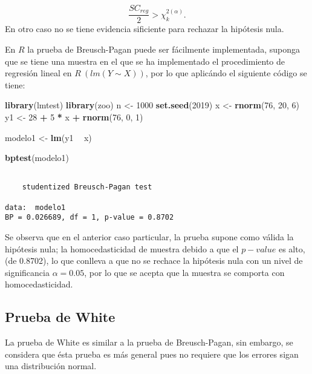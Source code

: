 \documentclass[a4paper,oneside,openany]{book}
\newenvironment{Shaded}{\begin{snugshade}}{\end{snugshade}}
\newcommand{\KeywordTok}[1]{\textcolor[rgb]{0.13,0.29,0.53}{\textbf{#1}}}
\newcommand{\DecValTok}[1]{\textcolor[rgb]{0.00,0.00,0.81}{#1}}
\newcommand{\StringTok}[1]{\textcolor[rgb]{0.31,0.60,0.02}{#1}}
\newcommand{\OperatorTok}[1]{\textcolor[rgb]{0.81,0.36,0.00}{\textbf{#1}}}
\newcommand{\NormalTok}[1]{#1}
\begin{document}
\[\frac{SC_{reg}}{2}> \chi^{2(\alpha)}_{k}.\] En otro caso no se tiene
evidencia sificiente para rechazar la hipótesis nula.

En \(R\) la prueba de Breusch-Pagan puede ser fácilmente implementada,
suponga que se tiene una muestra en el que se ha implementado el
procedimiento de regresión lineal en \(R \ (lm(Y \sim X))\), por lo que
aplicándo el siguiente código se tiene:

\begin{Shaded}
\begin{Highlighting}[]
\KeywordTok{library}\NormalTok{(lmtest)}
\KeywordTok{library}\NormalTok{(zoo)}
\NormalTok{n <-}\StringTok{ }\DecValTok{1000} 
\KeywordTok{set.seed}\NormalTok{(}\DecValTok{2019}\NormalTok{)}
\NormalTok{x <-}\StringTok{ }\KeywordTok{rnorm}\NormalTok{(}\DecValTok{76}\NormalTok{, }\DecValTok{20}\NormalTok{, }\DecValTok{6}\NormalTok{) }
\NormalTok{y1 <-}\StringTok{ }\DecValTok{28} \OperatorTok{+}\StringTok{ }\DecValTok{5} \OperatorTok{*}\StringTok{ }\NormalTok{x }\OperatorTok{+}\StringTok{ }\KeywordTok{rnorm}\NormalTok{(}\DecValTok{76}\NormalTok{, }\DecValTok{0}\NormalTok{, }\DecValTok{1}\NormalTok{)  }

\NormalTok{modelo1 <-}\StringTok{ }\KeywordTok{lm}\NormalTok{(y1 }\OperatorTok{~}\StringTok{ }\NormalTok{x)}

\KeywordTok{bptest}\NormalTok{(modelo1)}
\end{Highlighting}
\end{Shaded}

\begin{verbatim}

    studentized Breusch-Pagan test

data:  modelo1
BP = 0.026689, df = 1, p-value = 0.8702
\end{verbatim}

Se observa que en el anterior caso particular, la prueba supone como
válida la hipótesis nula; la homocedasticidad de muestra debido a que el
\(p-value\) es alto, (de 0.8702), lo que conlleva a que no se rechace la
hipótesis nula con un nivel de significancia \(\alpha=0.05\), por lo que
se acepta que la muestra se comporta con homocedasticidad.

\subsection{Prueba de White}\label{prueba-de-white}

La prueba de White es similar a la prueba de Breusch-Pagan, sin embargo,
se considera que ésta prueba es más general pues no requiere que los
errores sigan una distribución normal.
\end{document}
